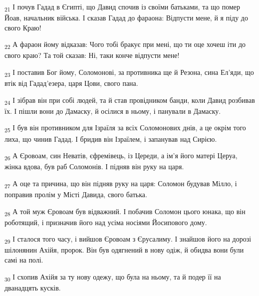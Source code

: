 \begin{tcolorbox}
\textsubscript{21} І почув Гадад в Єгипті, що Давид спочив із своїми батьками, та що помер Йоав, начальник війська. І сказав Гадад до фараона: Відпусти мене, й я піду до свого Краю!
\end{tcolorbox}
\begin{tcolorbox}
\textsubscript{22} А фараон йому відказав: Чого тобі бракує при мені, що ти оце хочеш іти до свого краю? Та той сказав: Ні, таки конче відпусти мене!
\end{tcolorbox}
\begin{tcolorbox}
\textsubscript{23} І поставив Бог йому, Соломонові, за противника ще й Резона, сина Ел'яди, що втік від Гадад'езера, царя Цови, свого пана.
\end{tcolorbox}
\begin{tcolorbox}
\textsubscript{24} І зібрав він при собі людей, та й став провідником банди, коли Давид розбивав їх. І пішли вони до Дамаску, й осілися в ньому, і панували в Дамаску.
\end{tcolorbox}
\begin{tcolorbox}
\textsubscript{25} І був він противником для Ізраїля за всіх Соломонових днів, а це окрім того лиха, що чинив Гадад. І бридив він Ізраїлем, і запанував над Сирією.
\end{tcolorbox}
\begin{tcolorbox}
\textsubscript{26} А Єровоам, син Неватів, єфремівець, із Цереди, а ім'я його матері Церуа, жінка вдова, був раб Соломонів. І підняв він руку на царя.
\end{tcolorbox}
\begin{tcolorbox}
\textsubscript{27} А оце та причина, що він підняв руку на царя: Соломон будував Мілло, і поправив пролім у Місті Давида, свого батька.
\end{tcolorbox}
\begin{tcolorbox}
\textsubscript{28} А той муж Єровоам був відважний. І побачив Соломон цього юнака, що він роботящий, і призначив його над усіма носіями Йосипового дому.
\end{tcolorbox}
\begin{tcolorbox}
\textsubscript{29} І сталося того часу, і вийшов Єровоам з Єрусалиму. І знайшов його на дорозі шілонянин Ахійя, пророк. Він був одягнений в нову одіж, й обидва вони були самі на полі.
\end{tcolorbox}
\begin{tcolorbox}
\textsubscript{30} І схопив Ахійя за ту нову одежу, що була на ньому, та й подер її на дванадцять кусків.
\end{tcolorbox}

